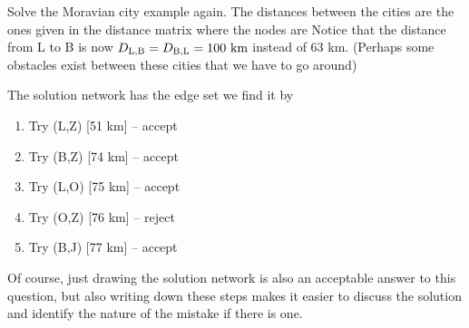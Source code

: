 
Solve the Moravian city example again. The distances between the cities are the ones given in the distance matrix  %
where the nodes are 
Notice that the distance from L to B is now $D_{\rm L,\rm B}=D_{\rm B,\rm L}=100{\rm\ km}$ instead of 63 km. (Perhaps some obstacles exist between these cities that we have to go around)

\solution
The solution network has the edge set 
we find it by
\begin{enumerate}[label=\arabic*.]
    \item Try (L,Z) [51 km] -- accept
    \item Try (B,Z) [74 km] -- accept
    \item Try (L,O) [75 km] -- accept
    \item Try (O,Z) [76 km] -- reject
    \item Try (B,J) [77 km] -- accept 
\end{enumerate}
Of course, just drawing the solution network is also an acceptable answer to this question, but also writing down these steps makes it easier to discuss the solution and identify the nature of the mistake if there is one.  

